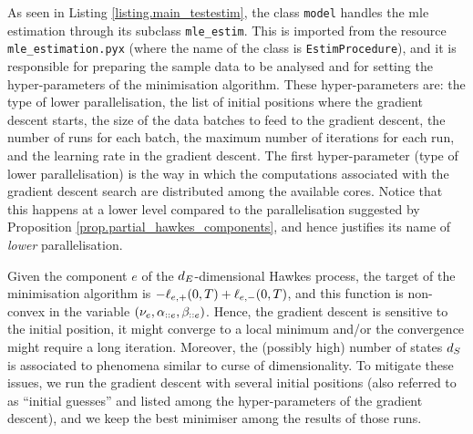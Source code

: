 \documentclass[10pt, article,table]{article}
\begin{document}
As seen in Listing \ref{listing.main_testestim}, the class \texttt{model} handles the mle estimation through its subclass \texttt{mle\_estim}. This is imported from the resource \texttt{mle\_estimation.pyx} (where the name of the class is \texttt{EstimProcedure}), and it is responsible for preparing the sample data to be analysed and for setting the hyper-parameters of the minimisation algorithm. These hyper-parameters are: the type of lower parallelisation, the list of initial positions where the gradient descent starts, the size of the data batches to feed to the gradient descent, the number of runs for each batch, the maximum number of iterations for each run, and the learning rate in the gradient descent.
The first hyper-parameter (type of lower parallelisation) is the way in which the computations associated with the gradient descent search are distributed among the available cores. Notice that this happens at a lower level compared to the parallelisation suggested by Proposition \ref{prop.partial_hawkes_components}, and hence justifies its name of \emph{lower} parallelisation. 

Given the component $e$ of the $d_{E}$-dimensional Hawkes process, the target of the minimisation algorithm is $-\ell_{e,+}(0,T) + \ell_{e,-}(0,T)$, and this function is non-convex in the variable $(\nu_e,\alpha_{::e},\beta_{::e})$. Hence, the gradient descent is sensitive to the initial position, it might converge to a local minimum and/or the convergence might require a long iteration. Moreover, the (possibly high) number of states $d_{S}$ is associated to phenomena similar to curse of dimensionality. To mitigate these issues, we run the gradient descent with several initial positions (also referred to as ``initial guesses'' and listed among the hyper-parameters of the gradient descent), and we keep the best minimiser among the results of those runs.
\end{document}
